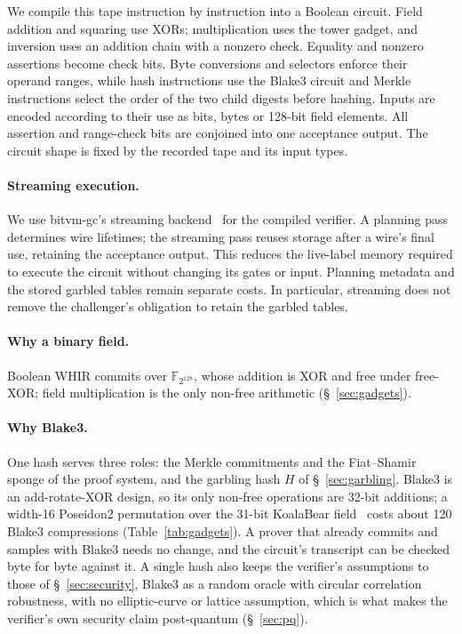 \documentclass[11pt]{article}
\newcommand{\F}{\mathbb{F}_{2^{128}}}
\newcommand{\XOR}{\textsf{XOR}}
\begin{document}
We compile this tape instruction by instruction into a Boolean circuit.
Field addition and squaring use \XOR{}s; multiplication uses
the tower gadget, and inversion uses an addition chain with a nonzero check.
Equality and nonzero assertions become check bits. Byte conversions and
selectors enforce their operand ranges, while hash instructions use the
Blake3 circuit and Merkle instructions select the order of the two child
digests before hashing. Inputs are encoded according to their use as bits,
bytes or 128-bit field elements. All assertion and range-check bits are
conjoined into one acceptance output. The circuit shape is fixed by the
recorded tape and its input types.

\paragraph{Streaming execution.} We use bitvm-gc's streaming backend~\cite{bitvmgc} for
the compiled verifier. A planning pass determines wire lifetimes;
the streaming pass reuses storage after a wire's final use, retaining the
acceptance output. This reduces the live-label memory required to execute
the circuit without changing its gates or input. Planning metadata and the
stored garbled tables remain separate costs. In particular, streaming does
not remove the challenger's obligation to retain the garbled tables.

\paragraph{Why a binary field.} Boolean WHIR commits over $\F$, whose
addition is \XOR{} and free under free-XOR; field multiplication is the only
non-free arithmetic (\S~\ref{sec:gadgets}).

\paragraph{Why Blake3.} One hash serves three roles: the Merkle commitments
and the Fiat--Shamir sponge of the proof system, and the garbling hash $H$ of
\S~\ref{sec:garbling}. Blake3 is an add-rotate-XOR design, so its only
non-free operations are 32-bit additions; a width-16 Poseidon2 permutation over the 31-bit KoalaBear field~\cite{poseidon2} costs about 120 Blake3 compressions
(Table~\ref{tab:gadgets}). A prover that already commits and samples with Blake3 needs
no change, and the circuit's transcript can be checked byte for byte against
it. A single hash also keeps the
verifier's assumptions to those of \S~\ref{sec:security}, Blake3 as a random
oracle with circular correlation robustness, with no elliptic-curve or lattice
assumption, which is what makes the verifier's own security claim
post-quantum (\S~\ref{sec:pq}).
\end{document}
